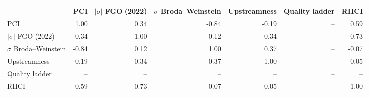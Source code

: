 \begin{tabular}{lrrrrrr}
\toprule
 & PCI & $|\sigma|$ FGO (2022) & $\sigma$ Broda--Weinstein & Upstreamness & Quality ladder & RHCI \\
\midrule
PCI & 1.00 & 0.34 & -0.84 & -0.19 & -- & 0.59 \\
$|\sigma|$ FGO (2022) & 0.34 & 1.00 & 0.12 & 0.34 & -- & 0.73 \\
$\sigma$ Broda--Weinstein & -0.84 & 0.12 & 1.00 & 0.37 & -- & -0.07 \\
Upstreamness & -0.19 & 0.34 & 0.37 & 1.00 & -- & -0.05 \\
Quality ladder & -- & -- & -- & -- & -- & -- \\
RHCI & 0.59 & 0.73 & -0.07 & -0.05 & -- & 1.00 \\
\bottomrule
\end{tabular}
